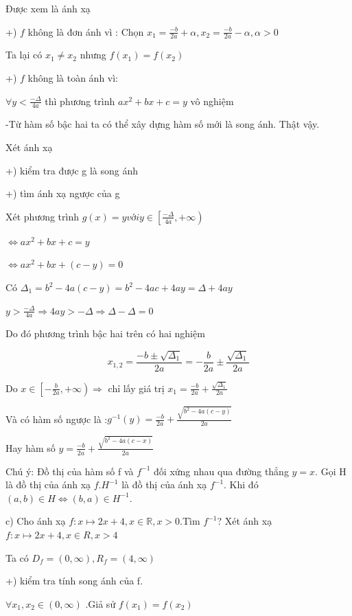 \documentclass[12pt,oneside,a4paper,reqno]{book}
\begin{document}
     Được xem là ánh xạ 
           
 +) $f$ không là đơn ánh vì :
Chọn $x_1=\frac{-b}{2a}+\alpha ,x_2=\frac{-b}{2a}-\alpha ,\alpha>0$

Ta lại có $x_1\neq x_2$  nhưng $f(x_1 )=f(x_2)$

 +) $f$ không là toàn ánh vì:
 
$\forall y< \frac{-\Delta}{4a}$ thì phương trình $ax^2+bx+c=y$ vô nghiệm 

-Từ hàm số bậc hai ta có thể xây dựng hàm số mới là song ánh.
Thật vậy.

Xét ánh xạ \fullfunction{g}{\left[-\frac{b}{2a},+\infty \right ) }{ \left[-\frac{\Delta}{4a} ,+\infty \right )}{x}{ax^2+bx+c}


+) kiểm tra được g là song ánh

+) tìm ánh xạ ngược của g

Xét phương trình $g(x)=y với y\in \left[\frac{-\Delta}{4a},+\infty \right )$

$\Leftrightarrow ax^2+bx+c=y$

$\Leftrightarrow ax^2+bx+(c-y)=0$

Có $\Delta_1=b^2-4a(c-y)=b^2-4ac+4ay=\Delta+4ay$

$y>\frac{-\Delta}{4a}\Rightarrow 4ay>-\Delta \Rightarrow \Delta -\Delta =0$

Do đó phương trình bậc hai trên có hai nghiệm

$$x_{1,2}=\frac{-b\pm \sqrt{\Delta_1}}{2a}=-\frac{b}{2a}\pm \frac{\sqrt{\Delta_1}}{2a}$$

Do $x\in \left[-\frac{b}{2a},+\infty \right )\Rightarrow $ chỉ lấy giá trị $x_1=\frac{-b}{2a}+\frac{\sqrt{\Delta_1}}{2a}$

Và có hàm số ngược là :$g^{-1}(y)=\frac{-b}{2a}+\frac{\sqrt{b^2-4a(c-y)}}{2a}$

Hay hàm số $y=\frac{-b}{2a}+\frac{\sqrt{b^2-4a(c-x)}}{2a}$

Chú ý: Đồ thị của  hàm số f và $f^{-1}$ đối xứng nhau qua đường thẳng $y=x$. Gọi H là đồ thị của ánh xạ $f. H^{-1}$ là đồ thị của ánh xạ $f^{-1}$. Khi đó $(a,b)\in H \Leftrightarrow (b,a)\in H^{-1}$.

c) Cho ánh xạ $f:x\mapsto 2x+4,x\in \mathbb{R},x>0$.Tìm $f^{-1}$?
Xét ánh xạ $f:x\mapsto 2x+4,x\in R,x>4$

Ta có $D_f=(0,\infty),R_f=(4,\infty)$

+) kiểm tra tính song ánh của f.

$\forall x_1,x_2\in (0,\infty)$ .Giả sử $f(x_1 )=f(x_2 )$
\end{document}
